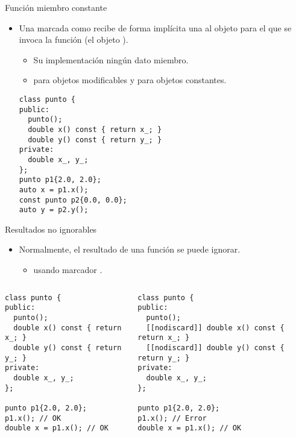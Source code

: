 \begin{frame}[t,fragile]{Función miembro constante}
\begin{itemize}
  \item Una  marcada como  
        recibe de forma implícita una 
        al objeto para el que se invoca la función (el objeto ).
    \begin{itemize}
      \item Su implementación  ningún dato miembro.
      \item {} para objetos 
            modificables y para objetos constantes.
    \end{itemize}
\begin{lstlisting}
class punto {
public:
  punto();
  double x() const { return x_; }
  double y() const { return y_; }
private:
  double x_, y_;
};
punto p1{2.0, 2.0};
auto x = p1.x();
const punto p2{0.0, 0.0};
auto y = p2.y();
\end{lstlisting}
\end{itemize}
\end{frame}

\begin{frame}[t,fragile]{Resultados no ignorables}
\begin{itemize}
  \item Normalmente, el resultado de una función se puede ignorar.
    \begin{itemize}
      \item {} usando marcador \cppkey{[[nodiscard]]}.
    \end{itemize}
\end{itemize}

\begin{columns}[T]

\pause
{}

\begin{lstlisting}
class punto {
public:
  punto();
  double x() const { return x_; }
  double y() const { return y_; }
private:
  double x_, y_;
};

punto p1{2.0, 2.0};
p1.x(); // OK
double x = p1.x(); // OK
\end{lstlisting}

\pause
{}
\begin{lstlisting}
class punto {
public:
  punto();
  [[nodiscard]] double x() const { return x_; }
  [[nodiscard]] double y() const { return y_; }
private:
  double x_, y_;
};

punto p1{2.0, 2.0};
p1.x(); // Error
double x = p1.x(); // OK
\end{lstlisting}

\end{columns}

\end{frame}

